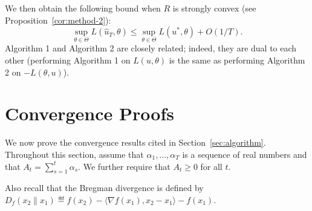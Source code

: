 \documentclass{article}
\begin{document}
We then obtain the following bound 
when $R$ is strongly convex (see Proposition~\ref{cor:method-2}):
\[ \sup_{\theta \in \Theta} L(\hat{u}_T, \theta) \leq \sup_{\theta \in \Theta} L(u^*, \theta) + O(1/T). \]
Algorithm 1 and Algorithm 2 are closely related; indeed, they are dual to each other 
(performing Algorithm 1 on $L(u,\theta)$ is the same as performing Algorithm 2 on 
$-L(\theta,u)$).

\section{Convergence Proofs}
\label{sec:proofs}
We now prove the convergence results cited in Section~\ref{sec:algorithm}. 
Throughout this section, assume that $\alpha_1,\ldots,\alpha_T$ is 
a sequence of real numbers and that $A_t = \sum_{s=1}^t \alpha_s$. 
We further require that $A_t \geq 0$ for all $t$.

Also recall that the Bregman divergence is defined by 
$D_f(x_2 \| x_1) \eqdef f(x_2) - \langle \nabla f(x_1), x_2-x_1 \rangle - f(x_1)$.
\end{document}
